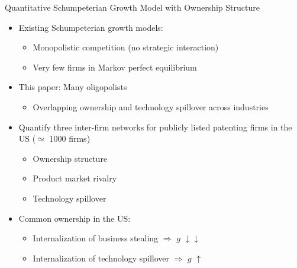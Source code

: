 \documentclass[
  10pt,
  aspectratio=169,   %
  handout           %
]{beamer}
\theoremstyle{plain}
\begin{document}
\begin{frame}{Quantitative Schumpeterian Growth Model with Ownership Structure}
  \begin{itemize}
    \item Existing Schumpeterian growth models:
    \begin{itemize}
      \item Monopolistic competition (no strategic interaction)
      \item Very few firms in Markov perfect equilibrium
    \end{itemize}
    \medskip{}
    \item This paper: Many oligopolists
    \begin{itemize}
      \item Overlapping ownership and technology spillover across industries
    \end{itemize}
    \medskip{}\pause
    \item Quantify three inter-firm networks for publicly listed patenting firms in the US ($\simeq$ 1000 firms)
    \begin{itemize}
      \item Ownership structure
      \item Product market rivalry
      \item Technology spillover
    \end{itemize}
    \medskip{}\pause
    \item Common ownership in the US:
    \begin{itemize}
      \item Internalization of business stealing $\Longrightarrow$ $g$ $\downarrow \downarrow$
      \item Internalization of technology spillover $\Longrightarrow$ $g$ $\uparrow$
    \end{itemize}
  \end{itemize}
\end{frame}
\end{document}

